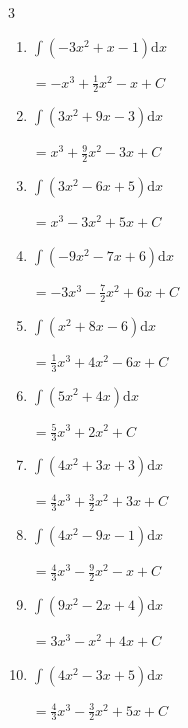\begin{multicols}{3}
\begin{enumerate}
        $\displaystyle =-3x^{3}+\frac{7}{2}x^{2}+4x+ C$

  \item $\displaystyle \int \left( -3x^{2}+x-1 \right) \mathrm{d}x$

        $\displaystyle =-x^{3}+\frac{1}{2}x^{2}-x+ C$

  \item $\displaystyle \int \left( 3x^{2}+9x-3 \right) \mathrm{d}x$

        $\displaystyle =x^{3}+\frac{9}{2}x^{2}-3x+ C$

\columnbreak %

  \item $\displaystyle \int \left( 3x^{2}-6x+5 \right) \mathrm{d}x$

        $\displaystyle =x^{3}-3x^{2}+5x+ C$

  \item $\displaystyle \int \left( -9x^{2}-7x+6 \right) \mathrm{d}x$

        $\displaystyle =-3x^{3}-\frac{7}{2}x^{2}+6x+ C$

  \item $\displaystyle \int \left( x^{2}+8x-6 \right) \mathrm{d}x$

        $\displaystyle =\frac{1}{3}x^{3}+4x^{2}-6x+ C$

  \item $\displaystyle \int \left( 5x^{2}+4x \right) \mathrm{d}x$

        $\displaystyle =\frac{5}{3}x^{3}+2x^{2}+ C$

  \item $\displaystyle \int \left( 4x^{2}+3x+3 \right) \mathrm{d}x$

        $\displaystyle =\frac{4}{3}x^{3}+\frac{3}{2}x^{2}+3x+ C$

  \item $\displaystyle \int \left( 4x^{2}-9x-1 \right) \mathrm{d}x$

        $\displaystyle =\frac{4}{3}x^{3}-\frac{9}{2}x^{2}-x+ C$

  \item $\displaystyle \int \left( 9x^{2}-2x+4 \right) \mathrm{d}x$

        $\displaystyle =3x^{3}-x^{2}+4x+ C$

  \item $\displaystyle \int \left( 4x^{2}-3x+5 \right) \mathrm{d}x$

        $\displaystyle =\frac{4}{3}x^{3}-\frac{3}{2}x^{2}+5x+ C$


\end{enumerate}
\end{multicols}

